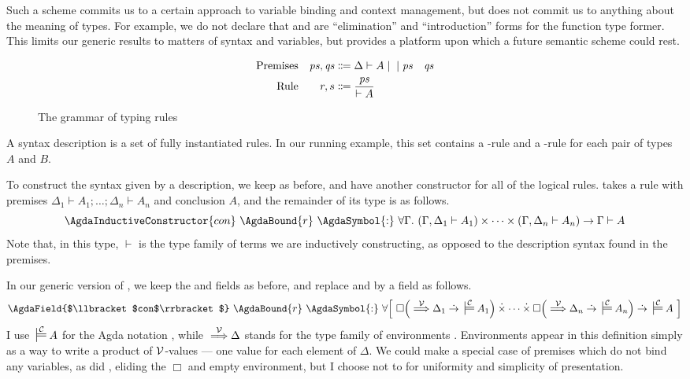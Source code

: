 Such a scheme commits us to a certain approach to variable binding and context
management, but does not commit us to anything about the meaning of types.
For example, we do not declare that  and  are
``elimination'' and ``introduction'' forms for the function type former.
This limits our generic results to matters of syntax and variables, but provides
a platform upon which a future semantic scheme could rest.

\begin{figure}
  \begin{align*}
    \text{Premises} && \mathit{ps}, \mathit{qs} &\Coloneqq
      \Delta \vdash A \mid {} \mid \mathit{ps} \quad \mathit{qs}
    \\
    \text{Rule} && r, s &\Coloneqq {\mathit{ps} \over \vdash A}
  \end{align*}
  \caption{The grammar of typing rules}
  \label{fig:simple-syntax}
\end{figure}

A syntax description is a set of fully instantiated rules.
In our running example, this set contains a -rule and a
-rule for each pair of types $A$ and $B$.

To construct the syntax given by a description, we keep
 as before, and have another constructor
 for all of the logical rules.
 takes a rule  with premises
$\Delta_1 \vdash A_1; \ldots; \Delta_n \vdash A_n$ and conclusion $A$, and the
remainder of its type is as follows.
\[
  \AgdaInductiveConstructor{con}~\AgdaBound{r}~\AgdaSymbol{:}~%
  \forall\Gamma.~(\Gamma, \Delta_1 \vdash A_1) \times \cdots
  \times (\Gamma, \Delta_n \vdash A_n) \to \Gamma \vdash A
\]
Note that, in this type, $\vdash$ is the type family of terms we are
inductively constructing, as opposed to the description syntax found in the
premises.

In our generic version of , we keep the
 and 
fields as before, and replace  and
 by a
 field as follows.
\[
  \AgdaField{$\llbracket$con$\rrbracket$}~\AgdaBound{r}~\AgdaSymbol{:}~%
  \forallb{%
    \Box\plr{{} \env\V \Delta_1 \dotto {} \sdtstile{}\C A_1} \dottimes
    \cdots \dottimes
    \Box\plr{{} \env\V \Delta_n \dotto {} \sdtstile{}\C A_n} \dotto
    {} \sdtstile{}\C A}
\]
I use ${} \sdtstile{}\C A$ for the Agda notation
\AgdaFunction{\_$\C\vDash$}\AgdaSpace{}, while ${} \stackrel{\mathcal V}\Longrightarrow \Delta$
stands for the type family of environments
\AgdaSymbol{$\lambda$}\AgdaSpace{}\AgdaBound{$\Gamma$}\AgdaSpace{}%
\AgdaSymbol{$\to$}\AgdaSpace{}\AgdaSpace{}\AgdaBound{$\V$}%
\AgdaSpace{}\AgdaBound{$\Gamma$}\AgdaSpace{}\AgdaBound{$\Delta$}.
Environments appear in this definition simply as a way to write a product of
$\V$-values --- one value for each element of $\Delta$.
We could make a special case of premises which do not bind any variables, as did
\citet{AACMM21}, eliding the $\Box$ and empty environment, but I choose not to
for uniformity and simplicity of presentation.

